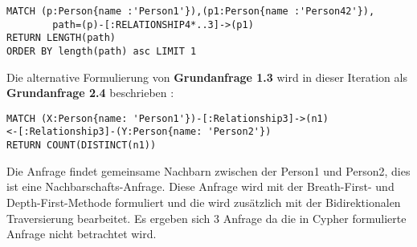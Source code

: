 \begin{Verbatim}[frame=single]
MATCH (p:Person{name :'Person1'}),(p1:Person{name :'Person42'}),
		path=(p)-[:RELATIONSHIP4*..3]->(p1) 
RETURN LENGTH(path)
ORDER BY length(path) asc LIMIT 1
\end{Verbatim}
Die alternative Formulierung von \textbf{Grundanfrage 1.3} wird in dieser Iteration als \textbf{Grundanfrage 2.4}  beschrieben :
\begin{Verbatim}[frame=single]
MATCH (X:Person{name: 'Person1'})-[:Relationship3]->(n1)
<-[:Relationship3]-(Y:Person{name: 'Person2'})
RETURN COUNT(DISTINCT(n1))
\end{Verbatim}
Die Anfrage findet gemeinsame Nachbarn zwischen der Person1 und Person2, dies ist eine  Nachbarschafts-Anfrage. Diese Anfrage wird mit der Breath-First- und Depth-First-Methode formuliert und die  wird zusätzlich mit der Bidirektionalen Traversierung bearbeitet. Es ergeben sich 3 Anfrage da die in Cypher formulierte Anfrage nicht betrachtet wird. 
